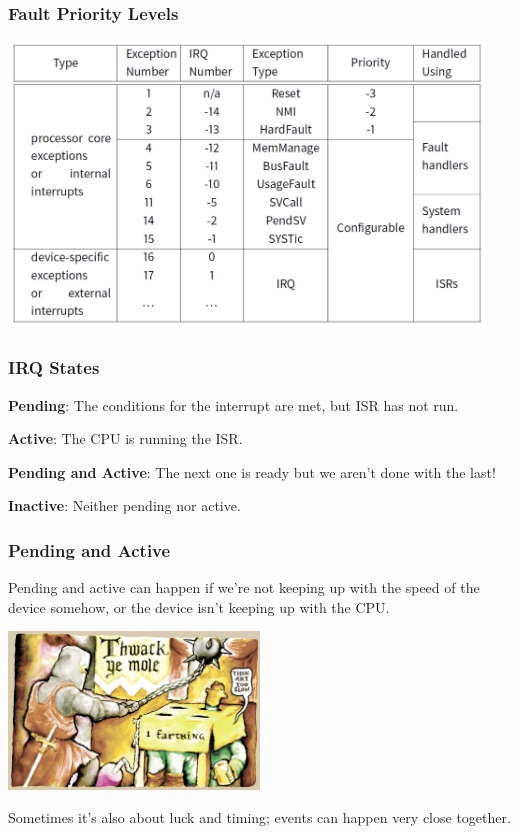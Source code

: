 \begin{frame}
\frametitle{Fault Priority Levels}

\begin{center}
	\includegraphics[width=0.95\textwidth]{images/fpl.png}
\end{center}

\end{frame}

\begin{frame}
\frametitle{IRQ States}

\textbf{Pending}: The conditions for the interrupt are met, but ISR has not run.

\textbf{Active}: The CPU is running the ISR.


\textbf{Pending and Active}: The next one is ready but we aren't done with the last!

\textbf{Inactive}: Neither pending nor active.


\end{frame}

\begin{frame}
\frametitle{Pending and Active}

Pending and active can happen if we're not keeping up with the speed of the device somehow, or the device isn't keeping up with the CPU.

\begin{center}
	\includegraphics[width=0.5\textwidth]{images/tooslow.png}
\end{center}

Sometimes it's also about luck and timing; events can happen very close together.

\end{frame}

